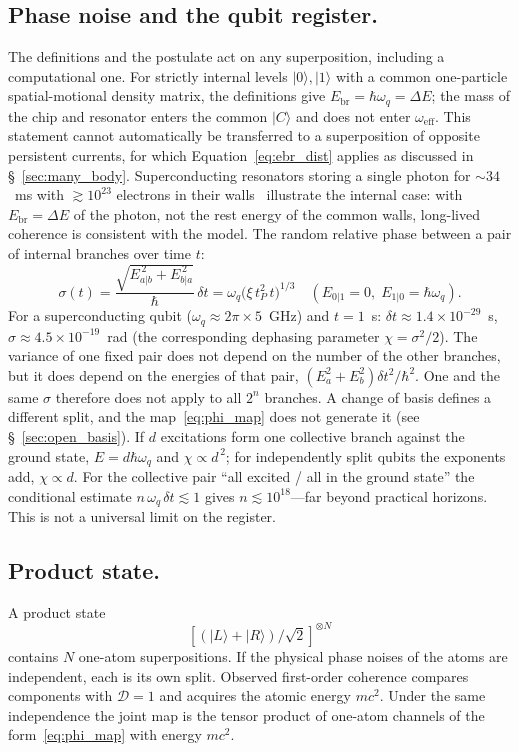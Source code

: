 \documentclass[11pt,a4paper]{article}
\begin{document}
\subsection{Phase noise and the qubit register.}
The definitions and the postulate act on any superposition, including a computational one. For strictly internal levels $|0\rangle,|1\rangle$ with a common one-particle spatial-motional density matrix, the definitions give $E_{\mathrm{br}}=\hbar\omega_q=\Delta E$; the mass of the chip and resonator enters the common $|C\rangle$ and does not enter $\omega_{\mathrm{eff}}$. This statement cannot automatically be transferred to a superposition of opposite persistent currents, for which Equation~\eqref{eq:ebr_dist} applies as discussed in \S~\ref{sec:many_body}. Superconducting resonators storing a single photon for $\sim\!34$~ms with $\gtrsim10^{23}$ electrons in their walls~\cite{milul2023cavity} illustrate the internal case: with $E_{\mathrm{br}}=\Delta E$ of the photon, not the rest energy of the common walls, long-lived coherence is consistent with the model. The random relative phase between a pair of internal branches over time $t$:
\begin{equation}
\sigma(t)=\frac{\sqrt{E_{a|b}^{\,2}+E_{b|a}^{\,2}}}{\hbar}\,\delta t
=\omega_q\bigl(\xi\,t_P^2\,t\bigr)^{1/3}
\quad (E_{0|1}=0,\;E_{1|0}=\hbar\omega_q).
\label{eq:sigmaq}
\end{equation}
For a superconducting qubit ($\omega_q\approx2\pi\times5$~GHz) and $t=1$~s: $\delta t\approx1.4\times10^{-29}$~s, $\sigma\approx4.5\times10^{-19}$~rad (the corresponding dephasing parameter $\chi=\sigma^2/2$). The variance of one fixed pair does not depend on the number of the other branches, but it does depend on the energies of that pair, $(E_a^2+E_b^2)\delta t^2/\hbar^2$. One and the same $\sigma$ therefore does not apply to all $2^n$ branches. A change of basis defines a different split, and the map~\eqref{eq:phi_map} does not generate it (see \S~\ref{sec:open_basis}). If $d$ excitations form one collective branch against the ground state, $E=d\hbar\omega_q$ and $\chi\propto d^{\,2}$; for independently split qubits the exponents add, $\chi\propto d$. For the collective pair ``all excited / all in the ground state'' the conditional estimate $n\,\omega_q\,\delta t\lesssim1$ gives $n\lesssim10^{18}$---far beyond practical horizons. This is not a universal limit on the register.

\subsection{Product state.}
A product state
\begin{equation}
\left[(|L\rangle+|R\rangle)/\sqrt2\right]^{\otimes N}
\end{equation}
contains $N$ one-atom superpositions. If the physical phase noises of the atoms are independent, each is its own split. Observed first-order coherence compares components with $\mathcal D=1$ and acquires the atomic energy $mc^2$. Under the same independence the joint map is the tensor product of one-atom channels of the form~\eqref{eq:phi_map} with energy $mc^2$.
\end{document}
